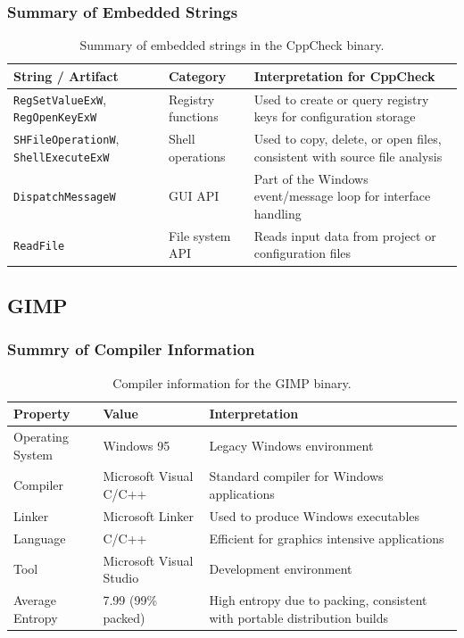 \documentclass{article}
\begin{document}
\subsubsection{Summary of Embedded Strings}
\begin{table}[H]
  \centering
  \begin{tabular}{|p{5cm}|p{3cm}|p{7cm}|}
    \hline
    \textbf{String / Artifact} & \textbf{Category} & \textbf{Interpretation for CppCheck} \\
    \hline
    \texttt{RegSetValueExW}, \texttt{RegOpenKeyExW} & Registry functions & Used to create or query registry keys for configuration storage \\
    \hline
    \texttt{SHFileOperationW}, \texttt{ShellExecuteExW} & Shell operations & Used to copy, delete, or open files, consistent with source file analysis \\
    \hline
    \texttt{DispatchMessageW} & GUI API & Part of the Windows event/message loop for interface handling \\
    \hline
    \texttt{ReadFile} & File system API & Reads input data from project or configuration files \\
    \hline
  \end{tabular}
  \caption{Summary of embedded strings in the CppCheck binary.}
  \label{tab:cppcheck-strings}
\end{table}

\subsection{GIMP}
\subsubsection{Summry of Compiler Information}
\begin{table}[H]
  \centering
  \begin{tabular}{|p{3cm}|p{3cm}|p{6cm}|}
    \hline
    \textbf{Property} & \textbf{Value} & \textbf{Interpretation} \\
    \hline
    Operating System & Windows 95 & Legacy Windows environment \\
    \hline
    Compiler & Microsoft Visual C/C++ & Standard compiler for Windows applications \\
    \hline
    Linker & Microsoft Linker & Used to produce Windows executables \\
    \hline
    Language & C/C++ & Efficient for graphics intensive applications \\
    \hline
    Tool & Microsoft Visual Studio & Development environment \\
    \hline
    Average Entropy & 7.99 (99\% packed) & High entropy due to packing, consistent with portable distribution builds \\
    \hline
  \end{tabular}
  \caption{Compiler information for the GIMP binary.}
  \label{tab:gimp-compiler}
\end{table}
\end{document}
